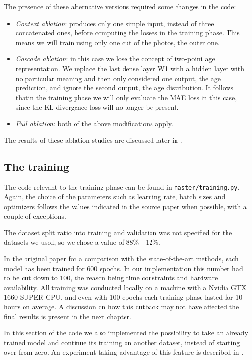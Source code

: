 The presence of these alternative versions required some changes in the code:

\begin{itemize}
    \item \textit{Context ablation}: produces only one simple input, instead of three concatenated ones, 
    before computing the losses in the training phase. This means we will train using only one cut of the 
    photos, the outer one.
    \item \textit{Cascade ablation}: in this case we lose the concept of two-point age representation.
    We replace the last dense layer W1 with a hidden layer with no particular meaning and then only
    considered one output, the age prediction, and ignore the second output, the age distribution.
    It follows thatin the training phase we will only evaluate the MAE loss in this case, since the KL 
    divergence loss will no longer be present. 
    \item \textit{Full ablation}: both of the above modifications apply.
\end{itemize}

The results of these ablation studies are discussed later in .

\subsection*{The training}
The code relevant to the training phase can be found in \texttt{master/training.py}. Again, the choice of
the parameters such as learning rate, batch sizes and optimizers follows the values indicated in the source 
paper when possible, with a couple of exceptions.

The dataset split ratio into training and validation was not specified for the datasets we used, so we 
chose a value of 88\% - 12\%.

In the original paper for a comparison with the state-of-the-art methods, each model has been trained for 
600 epochs. In our implementation this number had to be cut down to 100, the reason being time constraints 
and hardware availability. All training was conducted locally on a machine with a Nvidia GTX 1660 SUPER GPU, 
and even with 100 epochs each training phase lasted for 10 hours on average. A discussion on how this 
cutback may not have affected the final results is present in the next chapter.

In this section of the code we also implemented the possibility to take an already trained model and continue
its training on another dataset, instead of starting over from zero. An experiment taking advantage of this 
feature is described in .




